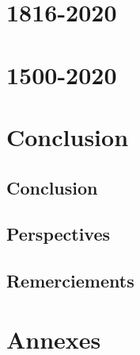 \documentclass[compress,9pt]{beamer}
\renewcommand{\footfullcite}[1]{\footnote[frame]{\fullcite{#1}}}
\begin{document}
\section{1816-2020}


\section{1500-2020}



\section{Conclusion}

	\subsection{Conclusion}
	\subsection{Perspectives}
	\subsection{Remerciements}
	
	
\section{Annexes}
	



%		
%	
%
%
\end{document}
